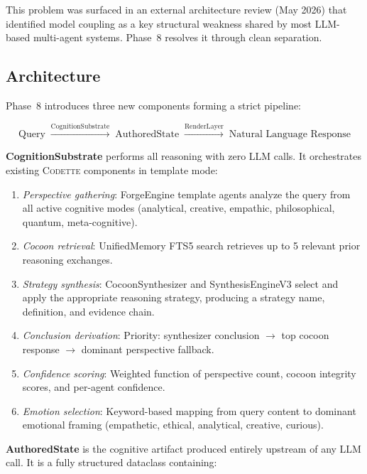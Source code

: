 \documentclass[11pt,a4paper]{article}
\newcommand{\codette}{\textsc{Codette}}
\begin{document}
This problem was surfaced in an external architecture review (May 2026) that
identified model coupling as a key structural weakness shared by most
LLM-based multi-agent systems. Phase~8 resolves it through clean separation.

\subsection{Architecture}

Phase~8 introduces three new components forming a strict pipeline:

\begin{equation}
\text{Query} \;\xrightarrow{\text{CognitionSubstrate}}\; \text{AuthoredState}
\;\xrightarrow{\text{RenderLayer}}\; \text{Natural Language Response}
\end{equation}

\textbf{CognitionSubstrate} performs all reasoning with zero LLM calls. It
orchestrates existing \codette{} components in template mode:

\begin{enumerate}[nosep]
  \item \emph{Perspective gathering}: ForgeEngine template agents analyze the
    query from all active cognitive modes (analytical, creative, empathic,
    philosophical, quantum, meta-cognitive).
  \item \emph{Cocoon retrieval}: UnifiedMemory FTS5 search retrieves up to 5
    relevant prior reasoning exchanges.
  \item \emph{Strategy synthesis}: CocoonSynthesizer and SynthesisEngineV3
    select and apply the appropriate reasoning strategy, producing a strategy
    name, definition, and evidence chain.
  \item \emph{Conclusion derivation}: Priority: synthesizer conclusion $\to$
    top cocoon response $\to$ dominant perspective fallback.
  \item \emph{Confidence scoring}: Weighted function of perspective count,
    cocoon integrity scores, and per-agent confidence.
  \item \emph{Emotion selection}: Keyword-based mapping from query content to
    dominant emotional framing (empathetic, ethical, analytical, creative,
    curious).
\end{enumerate}

\textbf{AuthoredState} is the cognitive artifact produced entirely upstream of
any LLM call. It is a fully structured dataclass containing:
\end{document}
